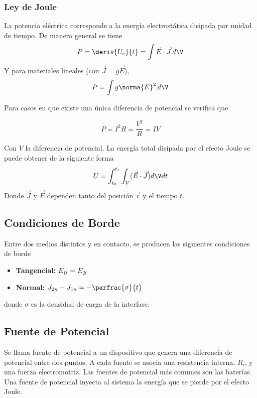 \subsubsection{Ley de Joule }
La potencia eléctrica corresponde a la energía electrostática disipada por unidad de tiempo. De manera general se tiene
\[P = \deriv{U_e}{t} = \int\Vec{E}\cdot\Vec{J}\,d\V\]
Y para materiales lineales (con $\Vec{J} = g\Vec{E}$),
\[P = \int g\norma{E}^2\,d\V\]

Para casos en que existe una única diferencia de potencial se verifica que

\[P = I^2R = \frac{V^2}{R} = IV\]

Con $V$ la diferencia de potencial. La energía total disipada por el efecto Joule se puede obtener de la siguiente forma
\[U = \int_{t_0}^{t_1}\int_V(\Vec{E}\cdot \Vec{J})d\V dt\]
Donde $\Vec{J}$ y $\Vec{E}$ dependen tanto del posición $\Vec{r}$ y el tiempo $t$.\\%


\subsection{Condiciones de Borde}

Entre dos medios distintos y en contacto, se producen las siguientes condiciones de borde

\begin{itemize}
    \item \textbf{Tangencial:} $E_{1t}=E_{2t}$
    \item \textbf{Normal:} $J_{2n}-J_{1n}=-\parfrac{\sigma}{t}$
\end{itemize}

donde $\sigma$ es la densidad de carga de la interfase.

\subsection{Fuente de Potencial}

Se llama fuente de potencial a un dispositivo que genera una diferencia de potencial entre dos puntos. A cada fuente se asocia una resistencia interna, $R_i$, y una fuerza electromotriz. Las fuentes de potencial más comunes son las baterías.\\
Una fuente de potencial inyecta al sistema la energía que se pierde por el efecto Joule.

